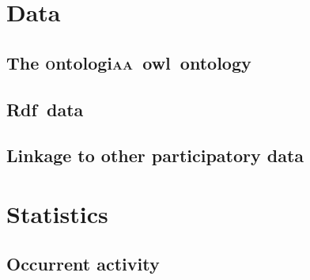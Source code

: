 \documentclass[a4paper, 11pt]{article} %
\newcommand{\ontologiaa}{\textsc{o}ntologi\textsc{aa}}
\newcommand{\owl}{{\sc owl}}
\newcommand{\rdfi}{{\sc Rdf}}
\begin{document}
\section{Data}\label{sec:data}
\subsection{The \ontologiaa\ \owl\ ontology}

\subsection{\rdfi\ data}

\subsection{Linkage to other participatory data}


\section{Statistics}\label{sec:stats}
\subsection{Occurrent activity}
\end{document}

